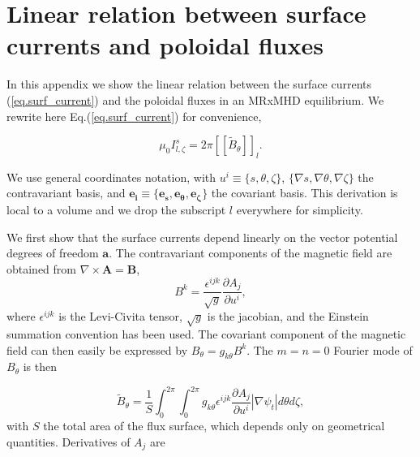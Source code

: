 \appendix



\chapter{Linear relation between surface currents and poloidal fluxes}\label{appA1}

In this appendix we show the linear relation between the surface currents (\ref{eq.surf_current}) and the poloidal fluxes in an \ac{MRxMHD} equilibrium. We rewrite here Eq.(\ref{eq.surf_current}) for convenience,

\begin{equation}
	\mu_0I^s_{l,\zeta} = 2\pi\left[\left[\tilde{B}_\theta\right]\right]_l.
\end{equation}

We use general coordinates notation, with $u^i\equiv\{s,\theta,\zeta\}$, $\{\nabla s,\nabla\theta,\nabla\zeta\}$ the contravariant basis, and $\mathbf{e_i}\equiv\{\mathbf{e_s},\mathbf{e_\theta},\mathbf{e_\zeta}\}$ the covariant basis. This derivation is local to a volume and we drop the subscript $l$ everywhere for simplicity.

We first show that the surface currents depend linearly on the vector potential degrees of freedom $\mathbf{a}$. The contravariant components of the magnetic field are obtained from $\nabla\times\mathbf{A}=\mathbf{B}$,
\begin{equation}
	B^k = \frac{\epsilon^{ijk}}{\sqrt{g}}\frac{\partial A_j}{\partial u^i},
\end{equation}
where  $\epsilon^{ijk}$ is the Levi-Civita tensor, $\sqrt{g}$ is the jacobian, and the Einstein summation convention has been used. The covariant component of the magnetic field can then easily be expressed by $B_\theta = g_{k\theta}B^k$. The $m=n=0$ Fourier mode of $B_\theta$ is then

\begin{equation}
	\tilde{B}_\theta = \frac{1}{S}\int_0^{2\pi}\int_0^{2\pi} g_{k\theta}\epsilon^{ijk}\frac{\partial A_j}{\partial u^i}|\nabla\psi_t| d\theta d\zeta, \label{eq.AppA1.1}
\end{equation}
with $S$ the total area of the flux surface, which depends only on geometrical quantities. Derivatives of $A_j$ are

